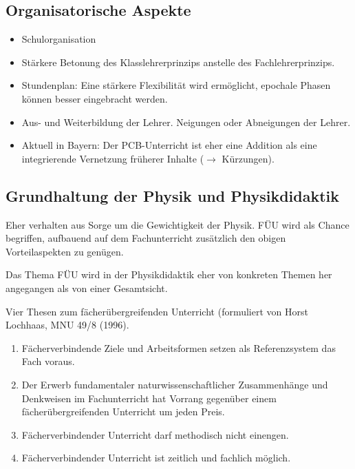 \subsection{Organisatorische Aspekte}

\begin{itemize}
\setlength{\itemsep}{0mm}
\item Schulorganisation
\item
St\"{a}rkere Betonung des Klasslehrerprinzips anstelle
des Fachlehrerprinzips.
\item Stundenplan:
Eine st\"{a}rkere Flexibilit\"{a}t wird erm\"{o}glicht, epochale Phasen
k\"{o}nnen besser eingebracht werden.
\item
Aus- und Weiterbildung der Lehrer.
Neigungen oder Abneigungen der Lehrer.
\item
Aktuell in Bayern: Der PCB-Unterricht ist eher eine Addition als eine
integrierende Vernetzung fr\"{u}herer Inhalte  ($\to$ K\"{u}rzungen).
\end{itemize}

\subsection{Grundhaltung der Physik und Physikdidaktik}

Eher verhalten aus Sorge um die Gewichtigkeit der Physik.
F\"{U}U wird als Chance begriffen, aufbauend auf dem
Fachunterricht zus\"{a}tzlich den obigen Vorteilaspekten zu gen\"{u}gen.

Das Thema F\"{U}U wird in der Physikdidaktik eher von konkreten
Themen her angegangen als von einer Gesamtsicht.

\bip
Vier Thesen zum f\"{a}cher\"{u}bergreifenden Unterricht
(formuliert von Horst Lochhaas, MNU 49/8 (1996).
\begin{enumerate}
\item
F\"{a}cherverbindende Ziele und Arbeitsformen setzen als
Referenzsystem das Fach voraus.
\item
Der Erwerb fundamentaler naturwissenschaftlicher
Zusammenh\"{a}nge und Denkweisen im Fachunterricht hat Vorrang
gegen\"{u}ber einem f\"{a}cher\"{u}bergreifenden Unterricht um jeden Preis.
\item
F\"{a}cherverbindender Unterricht darf methodisch nicht einengen.
\item
F\"{a}cherverbindender Unterricht ist zeitlich und fachlich m\"{o}glich.
\end{enumerate}


